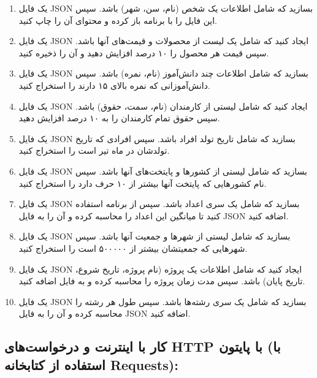 \documentclass[b5paper,12pt]{article}
\begin{document}
	\begin{enumerate}
		\item یک فایل JSON بسازید که شامل اطلاعات یک شخص (نام، سن، شهر) باشد. سپس این فایل را با برنامه باز کرده و محتوای آن را چاپ کنید.
		\item یک فایل JSON ایجاد کنید که شامل یک لیست از محصولات و قیمت‌های آنها باشد. سپس قیمت هر محصول را ۱۰ درصد افزایش دهید و آن را ذخیره کنید.
		\item یک فایل JSON بسازید که شامل اطلاعات چند دانش‌آموز (نام، نمره) باشد. سپس دانش‌آموزانی که نمره بالای ۱۵ دارند را استخراج کنید.
		\item یک فایل JSON ایجاد کنید که شامل لیستی از کارمندان (نام، سمت، حقوق) باشد. سپس حقوق تمام کارمندان را به ۱۰ درصد افزایش دهید.
		\item یک فایل JSON بسازید که شامل تاریخ تولد افراد باشد. سپس افرادی که تاریخ تولدشان در ماه تیر است را استخراج کنید.
		\item یک فایل JSON بسازید که شامل لیستی از کشورها و پایتخت‌های آنها باشد. سپس نام کشورهایی که پایتخت آنها بیشتر از ۱۰ حرف دارد را استخراج کنید.
		\item یک فایل JSON بسازید که شامل یک سری اعداد باشد. سپس از برنامه استفاده کنید تا میانگین این اعداد را محاسبه کرده و آن را به فایل JSON اضافه کنید.
		\item یک فایل JSON بسازید که شامل لیستی از شهرها و جمعیت آنها باشد. سپس شهرهایی که جمعیتشان بیشتر از ۵۰۰۰۰۰ است را استخراج کنید.
		\item یک فایل JSON ایجاد کنید که شامل اطلاعات یک پروژه (نام پروژه، تاریخ شروع، تاریخ پایان) باشد. سپس مدت زمان پروژه را محاسبه کرده و به فایل اضافه کنید.
		\item یک فایل JSON بسازید که شامل یک سری رشته‌ها باشد. سپس طول هر رشته را محاسبه کرده و آن را به فایل JSON اضافه کنید.
	\end{enumerate}
	
	
	\subsection*{کار با اینترنت و درخواست‌های HTTP با پایتون (با استفاده از کتابخانه Requests):}
	
\end{document}
